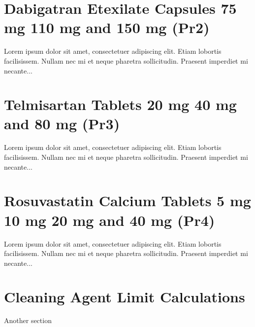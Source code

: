 \documentclass[a4paper,12pt]{report}
\begin{document}
\section*{Dabigatran Etexilate Capsules 75 mg 110 mg and 150 mg (Pr2)}
Lorem ipsum dolor sit amet, consectetuer adipiscing elit.  
Etiam lobortis facilisissem.  Nullam nec mi et neque pharetra 
sollicitudin.  Praesent imperdiet mi necante...
\section*{Telmisartan Tablets 20 mg 40 mg and 80 mg (Pr3)}
Lorem ipsum dolor sit amet, consectetuer adipiscing elit.  
Etiam lobortis facilisissem.  Nullam nec mi et neque pharetra 
sollicitudin.  Praesent imperdiet mi necante...
\section*{Rosuvastatin Calcium Tablets 5 mg 10 mg 20 mg and 40 mg (Pr4)}
Lorem ipsum dolor sit amet, consectetuer adipiscing elit.  
Etiam lobortis facilisissem.  Nullam nec mi et neque pharetra 
sollicitudin.  Praesent imperdiet mi necante...
\section{Cleaning Agent Limit Calculations}
Another section
\end{document}
